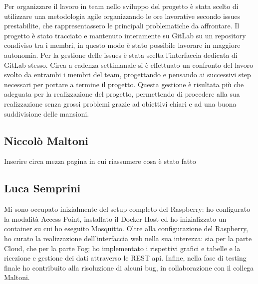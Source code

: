 Per organizzare il lavoro in team nello sviluppo del progetto è stata scelto di utilizzare
una metodologia agile organizzando le ore lavorative secondo issues prestabilite, che rappresentassero
le principali problematiche da affrontare. Il progetto è stato tracciato e mantenuto interamente su GitLab
su un repository condiviso tra i membri, in questo modo è stato possibile
lavorare in maggiore autonomia. Per la gestione delle issues è stata scelta l'interfaccia dedicata di GitLab stesso.
Circa a cadenza settimanale si è effettuato un confronto del lavoro svolto da entrambi i membri del team,
progettando e pensando ai successivi step  necessari per portare a termine il progetto.
Questa gestione è risultata più che adeguata per la
realizzazione del progetto, permettendo di procedere alla sua realizzazione senza
grossi problemi grazie ad obiettivi chiari e ad una buona suddivisione delle mansioni.

\subsection{Niccolò Maltoni}

Inserire circa mezza pagina in cui riassumere cosa è stato fatto

\subsection{Luca Semprini}

Mi sono occupato inizialmente del setup completo del Raspberry: ho configurato la modalità Access Point, installato il Docker Host ed ho inizializzato un container su cui ho eseguito Mosquitto.
Oltre alla configurazione del Raspberry, ho curato la realizzazione dell'interfaccia web nella sua interezza: sia per la parte Cloud, che per la parte Fog; ho implementato i rispettivi grafici e tabelle e la ricezione e gestione dei dati attraverso le REST api.
Infine, nella fase di testing finale ho contribuito alla risoluzione di alcuni bug, in collaborazione con il collega Maltoni.
